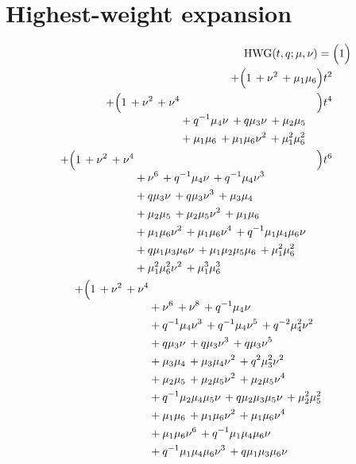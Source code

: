 \documentclass[10pt]{article}
\begin{document}
\section{Highest-weight expansion}
\[
\begin{aligned}
\mathrm{HWG}(t,q;\mu,\nu) ={}&
   \Bigl(1\Bigr) \\
  + \Bigl(1\,+\nu^{2}\,+\mu_1\mu_6\Bigr)t^{2} \\
  + \Bigl(\begin{aligned}[t]1\,+\nu^{2}\,+\nu^{4} \\
  &{}+q^{-1}\mu_4\nu\,+q\mu_3\nu\,+\mu_2\mu_5 \\
  &{}+\mu_1\mu_6\,+\mu_1\mu_6\nu^{2}\,+\mu_1^{2}\mu_6^{2}\end{aligned}\Bigr)t^{4} \\
  + \Bigl(\begin{aligned}[t]1\,+\nu^{2}\,+\nu^{4} \\
  &{}+\nu^{6}\,+q^{-1}\mu_4\nu\,+q^{-1}\mu_4\nu^{3} \\
  &{}+q\mu_3\nu\,+q\mu_3\nu^{3}\,+\mu_3\mu_4 \\
  &{}+\mu_2\mu_5\,+\mu_2\mu_5\nu^{2}\,+\mu_1\mu_6 \\
  &{}+\mu_1\mu_6\nu^{2}\,+\mu_1\mu_6\nu^{4}\,+q^{-1}\mu_1\mu_4\mu_6\nu \\
  &{}+q\mu_1\mu_3\mu_6\nu\,+\mu_1\mu_2\mu_5\mu_6\,+\mu_1^{2}\mu_6^{2} \\
  &{}+\mu_1^{2}\mu_6^{2}\nu^{2}\,+\mu_1^{3}\mu_6^{3}\end{aligned}\Bigr)t^{6} \\
  + \Bigl(\begin{aligned}[t]1\,+\nu^{2}\,+\nu^{4} \\
  &{}+\nu^{6}\,+\nu^{8}\,+q^{-1}\mu_4\nu \\
  &{}+q^{-1}\mu_4\nu^{3}\,+q^{-1}\mu_4\nu^{5}\,+q^{-2}\mu_4^{2}\nu^{2} \\
  &{}+q\mu_3\nu\,+q\mu_3\nu^{3}\,+q\mu_3\nu^{5} \\
  &{}+\mu_3\mu_4\,+\mu_3\mu_4\nu^{2}\,+q^{2}\mu_3^{2}\nu^{2} \\
  &{}+\mu_2\mu_5\,+\mu_2\mu_5\nu^{2}\,+\mu_2\mu_5\nu^{4} \\
  &{}+q^{-1}\mu_2\mu_4\mu_5\nu\,+q\mu_2\mu_3\mu_5\nu\,+\mu_2^{2}\mu_5^{2} \\
  &{}+\mu_1\mu_6\,+\mu_1\mu_6\nu^{2}\,+\mu_1\mu_6\nu^{4} \\
  &{}+\mu_1\mu_6\nu^{6}\,+q^{-1}\mu_1\mu_4\mu_6\nu \\
  &{}+q^{-1}\mu_1\mu_4\mu_6\nu^{3}\,+q\mu_1\mu_3\mu_6\nu \\

\end{aligned}
\end{aligned}\]
\end{document}
